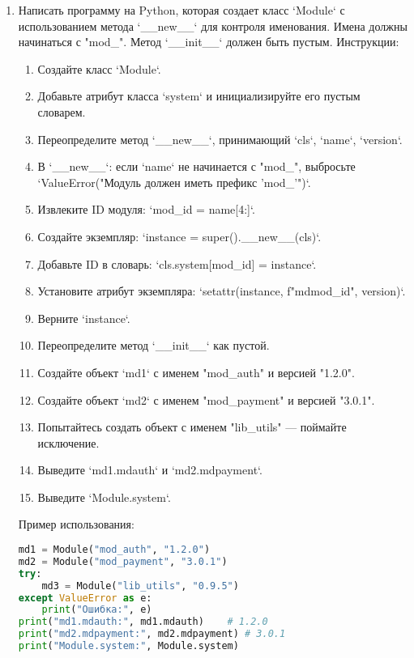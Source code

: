 \begin{enumerate}
\item Написать программу на Python, которая создает класс `Module` с использованием метода `\_\_new\_\_` для контроля именования. Имена должны начинаться с "mod\_". Метод `\_\_init\_\_` должен быть пустым.
Инструкции:
\begin{enumerate}
    \item Создайте класс `Module`.
    \item Добавьте атрибут класса `system` и инициализируйте его пустым словарем.
    \item Переопределите метод `\_\_new\_\_`, принимающий `cls`, `name`, `version`.
    \item В `\_\_new\_\_`: если `name` не начинается с "mod\_", выбросьте `ValueError("Модуль должен иметь префикс 'mod\_'")`.
    \item Извлеките ID модуля: `mod\_id = name[4:]`.
    \item Создайте экземпляр: `instance = super().\_\_new\_\_(cls)`.
    \item Добавьте ID в словарь: `cls.system[mod\_id] = instance`.
    \item Установите атрибут экземпляра: `setattr(instance, f"md{mod\_id}", version)`.
    \item Верните `instance`.
    \item Переопределите метод `\_\_init\_\_` как пустой.
    \item Создайте объект `md1` с именем "mod\_auth" и версией "1.2.0".
    \item Создайте объект `md2` с именем "mod\_payment" и версией "3.0.1".
    \item Попытайтесь создать объект с именем "lib\_utils" — поймайте исключение.
    \item Выведите `md1.mdauth` и `md2.mdpayment`.
    \item Выведите `Module.system`.
\end{enumerate}
Пример использования:
\begin{lstlisting}[language=Python]
md1 = Module("mod_auth", "1.2.0")
md2 = Module("mod_payment", "3.0.1")
try:
    md3 = Module("lib_utils", "0.9.5")
except ValueError as e:
    print("Ошибка:", e)
print("md1.mdauth:", md1.mdauth)    # 1.2.0
print("md2.mdpayment:", md2.mdpayment) # 3.0.1
print("Module.system:", Module.system)
\end{lstlisting}
\end{enumerate}
